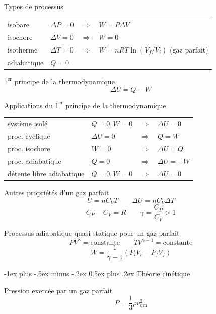\documentclass[10pt,landscape]{article}
\makeatletter
\renewcommand{\section}{\@startsection{section}{1}{0mm}%
                                {-1ex plus -.5ex minus -.2ex}%
                                {0.5ex plus .2ex}%
                                {\normalfont\large\bfseries}}
\newcommand{\halfline}{\vspace{0.5em}}
\newcommand{\tableindent}{\hspace{1.5em}}
\makeatother
\begin{document}
\begin{multicols}{3}
Types de processus \\
\begin{tabular}{@{\tableindent}llcp{33mm}<{\raggedright}}
	isobare & $\Delta P=0$  & $ \Longrightarrow$ & $W=P\Delta V$  \\
	isochore & $\Delta V=0$  & $\Longrightarrow$ & $W=0$ \\
	isotherme & $\Delta T=0$ & $\Longrightarrow$& $W=nRT\ln(V_f/V_i)$ \scriptsize{(gaz parfait)}\\
	adiabatique & $Q=0$ & & \\
\end{tabular}
\halfline

$1^\text{er}$ principe de la thermodynamique
\[ \Delta U = Q - W \]

Applications du $1^\text{er}$ principe de la thermodynamique \\
\renewcommand{\arraystretch}{1.2}
\begin{tabular}{@{\tableindent}m{24mm}<{\raggedright}p{18mm}<{\raggedright}cl}
	système isolé & $Q=0, W=0$ &$\Longrightarrow$ & $\Delta U = 0$ \\
	proc. cyclique & $\Delta U = 0$ &$\Longrightarrow$ & $Q=W$ \\
	proc. isochore & $W=0$ &$\Longrightarrow$ & $\Delta U = Q$ \\
	proc. adiabatique & $Q=0$ &$\Longrightarrow$ & $\Delta U = -W$ \\
	détente libre adiabatique & 
		$Q=0, W=0$ %
		&$\Longrightarrow$ & $\Delta U = 0$ \\
\end{tabular}
\renewcommand{\arraystretch}{1}
\halfline

Autres propriétés d'un gaz parfait
\[ 
U = n C_V T  
\qquad
\Delta U = n C_V \Delta T  
\]
\[ 
C_P - C_V = R
\qquad 
\gamma = \frac{C_P}{C_V} > 1 
\]

Processus adiabatique quasi statique pour un gaz parfait
\[ PV^\gamma = \text{constante} \qquad TV^{\gamma-1} = \text{constante}  \]
\[ W = \frac{1}{\gamma - 1} (P_i V_i - P_f V_f) \]

\hrulefill

\section{Théorie cinétique}

Pression exercée par un gaz parfait
\[ P = \frac{1}{3} \rho v^2_\text{qm} \]


\end{multicols}
\end{document}
